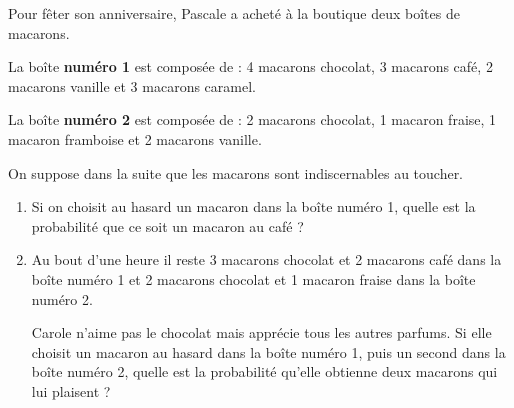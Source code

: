 
\medskip

Pour fêter son anniversaire, Pascale a acheté à la boutique deux boîtes de macarons.

La boîte \textbf{numéro 1} est composée de : 4 macarons chocolat, 3 macarons café, 2 macarons vanille
et 3 macarons caramel.

La boîte \textbf{numéro 2} est composée de : 2 macarons chocolat, 1 macaron fraise, 1 macaron
framboise et 2 macarons vanille.

On suppose dans la suite que les macarons sont indiscernables au toucher.

\medskip

\begin{enumerate}
\item Si on choisit au hasard un macaron dans la boîte numéro 1, quelle est la probabilité que ce soit
un macaron au café ?
\item Au bout d'une heure il reste 3 macarons chocolat et 2 macarons café dans la boîte numéro 1
et 2 macarons chocolat et 1 macaron fraise dans la boîte numéro 2.

Carole n'aime pas le chocolat mais apprécie tous les autres parfums. Si elle choisit un macaron
au hasard dans la boîte numéro 1, puis un second dans la boîte numéro 2, quelle est la probabilité
qu'elle obtienne deux macarons qui lui plaisent ?
\end{enumerate}

\bigskip

